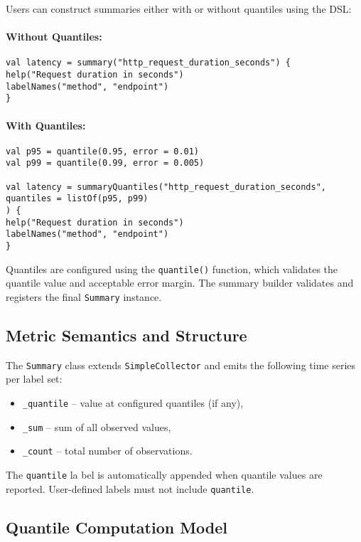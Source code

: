 Users can construct summaries either with or without quantiles using the DSL:

\paragraph{Without Quantiles:}
\begin{verbatim}
val latency = summary("http_request_duration_seconds") {
help("Request duration in seconds")
labelNames("method", "endpoint")
}
\end{verbatim}

\paragraph{With Quantiles:}
\begin{verbatim}
val p95 = quantile(0.95, error = 0.01)
val p99 = quantile(0.99, error = 0.005)

val latency = summaryQuantiles("http_request_duration_seconds",
quantiles = listOf(p95, p99)
) {
help("Request duration in seconds")
labelNames("method", "endpoint")
}
\end{verbatim}

Quantiles are configured using the \texttt{quantile()} function, which validates the quantile value and acceptable error margin. The summary builder validates and registers the final \texttt{Summary} instance.

\subsection{Metric Semantics and Structure}

The \texttt{Summary} class extends \texttt{SimpleCollector} and emits the following time series per label set:
\begin{itemize}
\item \texttt{\_quantile} – value at configured quantiles (if any),
\item \texttt{\_sum} – sum of all observed values,
\item \texttt{\_count} – total number of observations.
\end{itemize}

The \texttt{quantile} la bel is automatically appended when quantile values are reported. User-defined labels must not include \texttt{quantile}.

\subsection{Quantile Computation Model}


